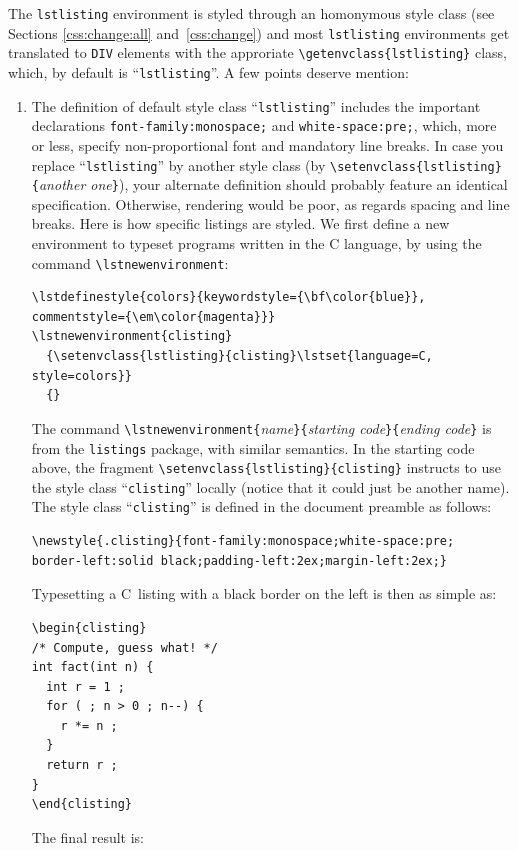 The \texttt{lstlisting} environment is styled through
an homonymous style class (see Sections \ref{css:change:all}
and~\ref{css:change}) and
most  \texttt{lstlisting} environments get translated to \verb+DIV+
elements with the approriate \verb+\getenvclass{lstlisting}+ class, 
which, by default is ``\texttt{lstlisting}''.
A few points deserve mention:
\begin{enumerate}
\item The definition of default style class ``\texttt{lstlisting}'' includes
the important declarations
\verb+font-family:monospace;+ and \verb+white-space:pre;+, which, more or less,
specify non-proportional font and mandatory line breaks.
In case you replace ``\texttt{lstlisting}'' by another style class (by
\verb+\setenvclass{lstlisting}{+\textit{another one}\verb+}+), your
alternate definition should probably feature an identical
specification. Otherwise, rendering would be poor, as regards spacing
and line breaks.
\ifhevea
Here is how specific listings are styled.
We first define a new environment to typeset programs written in the C
language, by using the command \verb+\lstnewenvironment+:
\begin{verbatim}
\lstdefinestyle{colors}{keywordstyle={\bf\color{blue}}, commentstyle={\em\color{magenta}}}
\lstnewenvironment{clisting}
  {\setenvclass{lstlisting}{clisting}\lstset{language=C, style=colors}}
  {}
\end{verbatim}
The command
\verb+\lstnewenvironment{+\textit{name}\verb+}{+\textit{starting
code}\verb+}{+\textit{ending code}\verb+}+ is from the
\texttt{listings} package, with similar semantics.
In the starting code above, the fragment
\verb+\setenvclass{lstlisting}{clisting}+ instructs \hevea{} to
use the style class ``\texttt{clisting}'' locally (notice that it could just
be another name). The style class ``\texttt{clisting}'' is defined in
the document preamble as follows:
\begin{verbatim}
\newstyle{.clisting}{font-family:monospace;white-space:pre;
border-left:solid black;padding-left:2ex;margin-left:2ex;}
\end{verbatim}
Typesetting a C~listing with a black border on the left is then as
simple as:
\begin{verbatim}
\begin{clisting}
/* Compute, guess what! */
int fact(int n) {
  int r = 1 ;
  for ( ; n > 0 ; n--) {
    r *= n ;
  }
  return r ;
}
\end{clisting}
\end{verbatim}
The final result is:

\end{enumerate}
